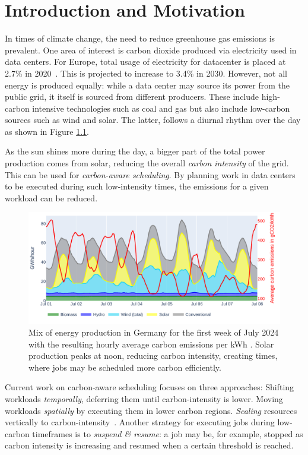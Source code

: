 \chapter{Introduction and Motivation}

In times of climate change, the need to reduce greenhouse gas emissions is prevalent. 
One area of interest is carbon dioxide produced via electricity used in data centers. 
For Europe, total usage of electricity for datacenter is placed at 2.7\% in 2020~.  
This is projected to increase to 3.4\% in 2030.
However, not all energy is produced equally: while a data center may source its power from the public grid, it itself is sourced from different producers. 
These include high-carbon intensive technologies such as coal and gas but also include low-carbon sources such as wind and solar. 
The latter, follows a diurnal rhythm over the day as shown in Figure \ref{fig:energy_mix}.

As the sun shines more during the day, a bigger part of the total power production comes from solar, reducing the overall \emph{carbon intensity} of the grid.
This can be used for \emph{carbon-aware scheduling}. 
By planning work in data centers to be executed during such low-intensity times, the emissions for a given workload can be reduced.
 
\begin{figure}[H] %
    \includegraphics[width=\linewidth]{agorameter/energy_production_week.pdf}
    \caption[short]{Mix of energy production in Germany for the first week of July 2024 with the resulting hourly average carbon emissions per kWh . Solar production peaks at noon, reducing carbon intensity, creating times, where jobs may be scheduled more carbon efficiently.}
    \label{fig:energy_mix}
\end{figure}

Current work on carbon-aware scheduling focuses on three approaches:
Shifting workloads \emph{temporally}, deferring them until carbon-intensity is lower.
Moving workloads \emph{spatially} by executing them in lower carbon regions.
\emph{Scaling} resources vertically to carbon-intensity~\cite{thiede_carbon_2023,jacob_does_2023}.
Another strategy for executing jobs during low-carbon timeframes is to \emph{suspend \& resume}: a job may be, for example, stopped as carbon intensity is increasing and resumed when a certain threshold is reached. 

